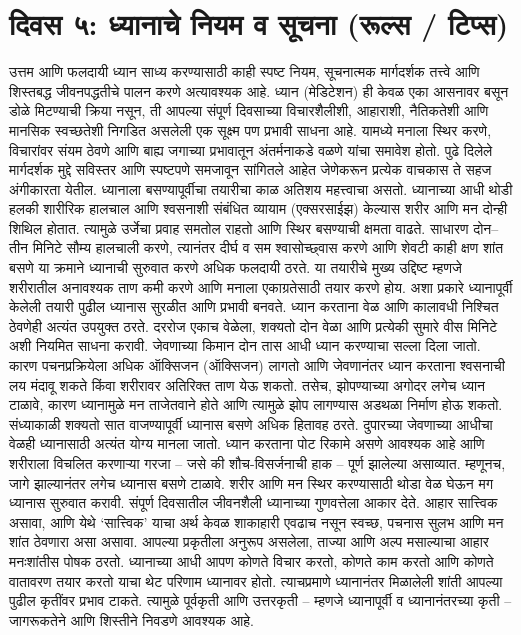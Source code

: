 \section*{दिवस ५: ध्यानाचे नियम व सूचना (रूल्स / टिप्स)}
उत्तम आणि फलदायी ध्यान साध्य करण्यासाठी काही स्पष्ट नियम, सूचनात्मक मार्गदर्शक तत्त्वे आणि शिस्तबद्ध जीवनपद्धतीचे पालन करणे अत्यावश्यक आहे. ध्यान (मेडिटेशन) ही केवळ एका आसनावर बसून डोळे मिटण्याची क्रिया नसून, ती आपल्या संपूर्ण दिवसाच्या विचारशैलीशी, आहाराशी, नैतिकतेशी आणि मानसिक स्वच्छतेशी निगडित असलेली एक सूक्ष्म पण प्रभावी साधना आहे. यामध्ये मनाला स्थिर करणे, विचारांवर संयम ठेवणे आणि बाह्य जगाच्या प्रभावातून अंतर्मनाकडे वळणे यांचा समावेश होतो. पुढे दिलेले मार्गदर्शक मुद्दे सविस्तर आणि स्पष्टपणे समजावून सांगितले आहेत जेणेकरून प्रत्येक वाचकास ते सहज अंगीकारता येतील.
ध्यानाला बसण्यापूर्वीचा तयारीचा काळ अतिशय महत्त्वाचा असतो. ध्यानाच्या आधी थोडी हलकी शारीरिक हालचाल आणि श्वसनाशी संबंधित व्यायाम (एक्सरसाईझ) केल्यास शरीर आणि मन दोन्ही शिथिल होतात. त्यामुळे उर्जेचा प्रवाह समतोल राहतो आणि स्थिर बसण्याची क्षमता वाढते. साधारण दोन–तीन मिनिटे सौम्य हालचाली करणे, त्यानंतर दीर्घ व सम श्वासोच्छ्वास करणे आणि शेवटी काही क्षण शांत बसणे या क्रमाने ध्यानाची सुरुवात करणे अधिक फलदायी ठरते. या तयारीचे मुख्य उद्दिष्ट म्हणजे शरीरातील अनावश्यक ताण कमी करणे आणि मनाला एकाग्रतेसाठी तयार करणे होय. अशा प्रकारे ध्यानापूर्वी केलेली तयारी पुढील ध्यानास सुरळीत आणि प्रभावी बनवते.
ध्यान करताना वेळ आणि कालावधी निश्चित ठेवणेही अत्यंत उपयुक्त ठरते. दररोज एकाच वेळेला, शक्यतो दोन वेळा आणि प्रत्येकी सुमारे वीस मिनिटे अशी नियमित साधना करावी. जेवणाच्या किमान दोन तास आधी ध्यान करण्याचा सल्ला दिला जातो. कारण पचनप्रक्रियेला अधिक ऑक्सिजन (ऑक्सिजन) लागतो आणि जेवणानंतर ध्यान करताना श्वसनाची लय मंदावू शकते किंवा शरीरावर अतिरिक्त ताण येऊ शकतो. तसेच, झोपण्याच्या अगोदर लगेच ध्यान टाळावे, कारण ध्यानामुळे मन ताजेतवाने होते आणि त्यामुळे झोप लागण्यास अडथळा निर्माण होऊ शकतो. संध्याकाळी शक्यतो सात वाजण्यापूर्वी ध्यानास बसणे अधिक हितावह ठरते. दुपारच्या जेवणाच्या आधीचा वेळही ध्यानासाठी अत्यंत योग्य मानला जातो. ध्यान करताना पोट रिकामे असणे आवश्यक आहे आणि शरीराला विचलित करणाऱ्या गरजा – जसे की शौच-विसर्जनाची हाक – पूर्ण झालेल्या असाव्यात. म्हणूनच, जागे झाल्यानंतर लगेच ध्यानास बसणे टाळावे. शरीर आणि मन स्थिर करण्यासाठी थोडा वेळ घेऊन मग ध्यानास सुरुवात करावी.
संपूर्ण दिवसातील जीवनशैली ध्यानाच्या गुणवत्तेला आकार देते. आहार सात्त्विक असावा, आणि येथे ‘सात्त्विक’ याचा अर्थ केवळ शाकाहारी एवढाच नसून स्वच्छ, पचनास सुलभ आणि मन शांत ठेवणारा असा असावा. आपल्या प्रकृतीला अनुरूप असलेला, ताज्या आणि अल्प मसाल्याचा आहार मनःशांतीस पोषक ठरतो. ध्यानाच्या आधी आपण कोणते विचार करतो, कोणते काम करतो आणि कोणते वातावरण तयार करतो याचा थेट परिणाम ध्यानावर होतो. त्याचप्रमाणे ध्यानानंतर मिळालेली शांती आपल्या पुढील कृतींवर प्रभाव टाकते. त्यामुळे पूर्वकृती आणि उत्तरकृती – म्हणजे ध्यानापूर्वी व ध्यानानंतरच्या कृती – जागरूकतेने आणि शिस्तीने निवडणे आवश्यक आहे.
